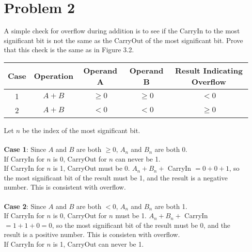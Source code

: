\documentclass[10pt,letterpaper]{article}
\begin{document}
\section{Problem 2}
A simple check for overflow during addition is to see if the CarryIn to the most significant bit is not the same as the CarryOut of the most significant bit. Prove that this check is the same as in Figure 3.2.\\
\begin{center}
\begin{tabular}{ |c|c|c|c|c| }
\hline
\textbf{Case} & \textbf{Operation} & \textbf{Operand A} & \textbf{Operand B} & \textbf{Result Indicating Overflow} \\
\hline
1 & $A + B$ & $\geq 0$ & $\geq 0$ & $< 0$ \\
\hline
2 & $A + B$ & $< 0$ & $< 0$ & $\geq 0$ \\
\hline
\end{tabular}
\end{center}
Let $n$ be the index of the most significant bit.\\\\
\textbf{Case 1}: Since $A$ and $B$ are both $\geq 0$, $A_n$ and $B_n$ are both 0.\\
If CarryIn for $n$ is 0, CarryOut for $n$ can never be 1.\\
If CarryIn for $n$ is 1, CarryOut must be 0. $A_n + B_n + $ CarryIn $ = 0 + 0 + 1$, so the most significant bit of the result must be 1, and the result is a negative number. This is consistent with overflow.\\\\
\textbf{Case 2}: Since $A$ and $B$ are both $< 0$, $A_n$ and $B_n$ are both 1.\\
If CarryIn for $n$ is 0, CarryOut for $n$ must be 1. $A_n + B_n +$ CarryIn $ = 1 + 1 + 0 = 0$, so the most significant bit of the result must be 0, and the result is a positive number. This is consisten with overflow.\\
If CarryIn for $n$ is 1, CarryOut can never be 1.\\
\pagebreak

\end{document}
